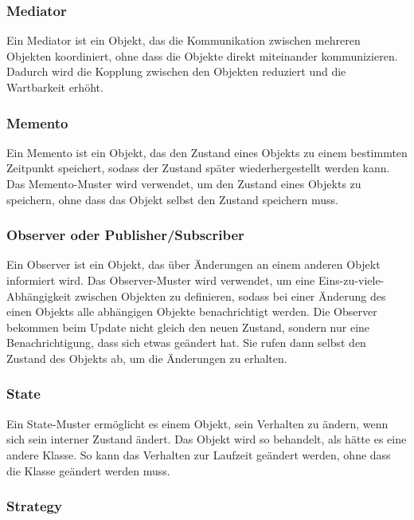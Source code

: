 \documentclass[12pt]{scrartcl}
\begin{document}
\subsubsection{Mediator}

Ein Mediator ist ein Objekt, das die Kommunikation zwischen mehreren Objekten koordiniert, ohne dass die Objekte direkt miteinander kommunizieren.
Dadurch wird die Kopplung zwischen den Objekten reduziert und die Wartbarkeit erhöht.

\subsubsection{Memento}

Ein Memento ist ein Objekt, das den Zustand eines Objekts zu einem bestimmten Zeitpunkt speichert, sodass der Zustand später wiederhergestellt werden kann.
Das Memento-Muster wird verwendet, um den Zustand eines Objekts zu speichern, ohne dass das Objekt selbst den Zustand speichern muss.

\subsubsection{Observer oder Publisher/Subscriber}

Ein Observer ist ein Objekt, das über Änderungen an einem anderen Objekt informiert wird.
Das Observer-Muster wird verwendet, um eine Eins-zu-viele-Abhängigkeit zwischen Objekten zu definieren, sodass bei einer Änderung des einen Objekts alle abhängigen Objekte benachrichtigt werden.
Die Observer bekommen beim Update nicht gleich den neuen Zustand, sondern nur eine Benachrichtigung, dass sich etwas geändert hat.
Sie rufen dann selbst den Zustand des Objekts ab, um die Änderungen zu erhalten.

\subsubsection{State}

Ein State-Muster ermöglicht es einem Objekt, sein Verhalten zu ändern, wenn sich sein interner Zustand ändert.
Das Objekt wird so behandelt, als hätte es eine andere Klasse. So kann das Verhalten zur Laufzeit geändert werden, ohne dass die Klasse geändert werden muss.

\subsubsection{Strategy}
\end{document}
